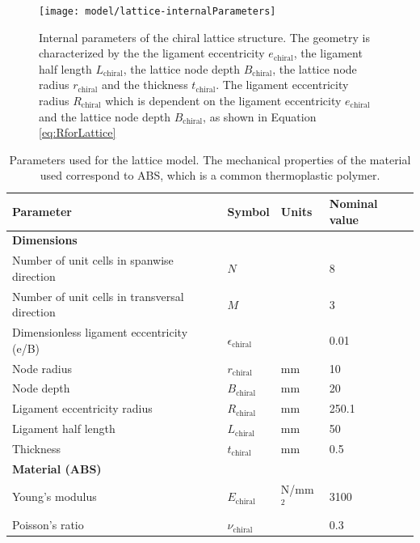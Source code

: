     \begin{figure}[!htpb]
      \centering
      \texttt{[image: model/lattice-internalParameters]}
      \caption[Internal parameters of the chiral lattice structure]{Internal parameters of the chiral lattice structure. The geometry is characterized by the the ligament eccentricity $e_{\mathrm{chiral}}$, the ligament half length $L_{\mathrm{chiral}}$, the lattice node depth $B_{\mathrm{chiral}}$, the lattice node radius $r_{\mathrm{chiral}}$ and the thickness $t_{\mathrm{chiral}}$. The ligament eccentricity radius $R_{\mathrm{chiral}}$ which is dependent on the ligament eccentricity $e_{\mathrm{chiral}}$ and the lattice node depth $B_{\mathrm{chiral}}$, as shown in Equation \ref{eq:RforLattice}}\label{fig:lattice-internalParameters}
    \end{figure}

    \begin{table}[!htpb]
    \centering
    \begin{tabular}{|l|lll|}
    \hline
    \textbf{Parameter} & \multicolumn{1}{l|}{\textbf{Symbol}} & \multicolumn{1}{l|}{\textbf{Units}} & \textbf{Nominal value} \\ \hline \hline
    {\textbf{Dimensions}} &  &  &  \\ \hline
    Number of unit cells in spanwise direction & \multicolumn{1}{l|}{$N$} & \multicolumn{1}{l|}{} & 8 \\ \hline
    Number of unit cells in transversal direction & \multicolumn{1}{l|}{$M$} & \multicolumn{1}{l|}{} & 3 \\ \hline
    Dimensionless ligament eccentricity (e/B) & \multicolumn{1}{l|}{$\epsilon_{\mathrm{chiral}}$} & \multicolumn{1}{l|}{} & 0.01 \\ \hline
    Node radius & \multicolumn{1}{l|}{$r_{\mathrm{chiral}}$} & \multicolumn{1}{l|}{mm} & 10 \\ \hline
    Node depth & \multicolumn{1}{l|}{$B_{\mathrm{chiral}}$} & \multicolumn{1}{l|}{mm} & 20 \\ \hline
    Ligament eccentricity radius & \multicolumn{1}{l|}{$R_{\mathrm{chiral}}$} & \multicolumn{1}{l|}{mm} & 250.1 \\ \hline
    Ligament half length & \multicolumn{1}{l|}{$L_{\mathrm{chiral}}$} & \multicolumn{1}{l|}{mm} & 50 \\ \hline
    Thickness & \multicolumn{1}{l|}{$t_{\mathrm{chiral}}$} & \multicolumn{1}{l|}{mm} & 0.5 \\ \hline \hline
    {\textbf{Material (ABS)}} &  &  &  \\ \hline
    Young's modulus & \multicolumn{1}{l|}{$E_{\mathrm{chiral}}$} & \multicolumn{1}{l|}{N/mm$^2$} & 3100 \\ \hline
    Poisson's ratio & \multicolumn{1}{l|}{$\nu_{\mathrm{chiral}}$} & \multicolumn{1}{l|}{} & 0.3 \\ \hline
    \end{tabular}
    \caption[Parameters used for the lattice model]{Parameters used for the lattice model. The mechanical properties of the material used correspond to ABS, which is a common thermoplastic polymer.}
    \label{tab:parameters_lattice}
    \end{table}

